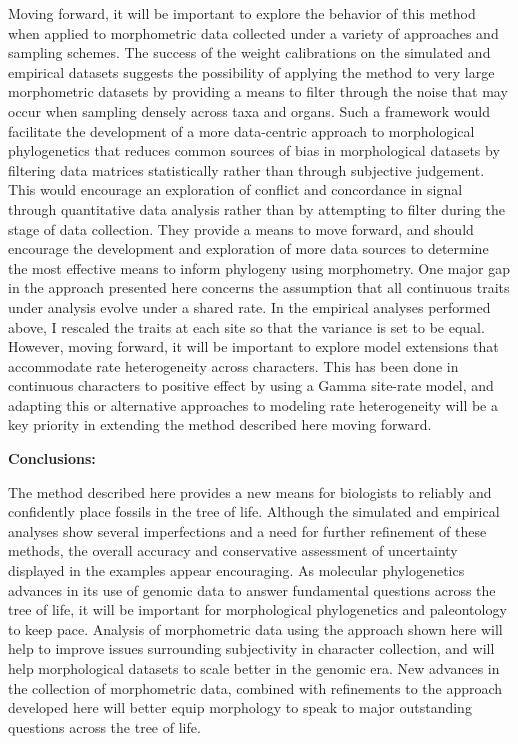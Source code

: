 \documentclass[12pt]{article}
\begin{document}
Moving forward, it will be important to explore the behavior of this
method when applied to morphometric data collected under a variety of
approaches and sampling schemes. The success of the weight calibrations
on the simulated and empirical datasets suggests the possibility of
applying the method to very large morphometric datasets by providing a
means to filter through the noise that may occur when  sampling
densely across taxa and organs. Such a framework would facilitate the
development of a more data-centric approach to morphological
phylogenetics that reduces common sources of bias in morphological 
datasets by filtering data matrices statistically rather than through subjective judgement.
 This would encourage an exploration of conflict and
concordance in signal through quantitative data analysis rather than by
attempting to filter during the stage of data collection. They provide
a means to move forward, and should encourage the development and
exploration of more data sources to determine the most effective means
to inform phylogeny using morphometry. One major gap in the approach 
presented here concerns the assumption that all continuous traits under
analysis evolve under a shared rate. In the empirical analyses performed 
above, I rescaled the traits at each 
site so that the variance is set to be equal. However, moving forward, it 
will be important to explore model extensions that accommodate rate
heterogeneity across characters. This has been done in continuous characters
to positive effect by \cite{schraiber2013inferring} using a Gamma site-rate
model, and adapting this or alternative approaches to modeling rate 
heterogeneity \citep{huelsenbeck2007nonparametric} will be a key 
priority in extending the method described here moving forward.


\noindent\textbf{Conclusions:}

The method described here provides a new means for biologists to
reliably and confidently place fossils in the tree of life. Although the
simulated and empirical analyses show several imperfections and a need
for further refinement of these methods, the overall accuracy and
conservative assessment of uncertainty displayed in the examples appear
encouraging. As molecular phylogenetics advances in its use of genomic
data to answer fundamental questions across the tree of life, it will be
important for morphological phylogenetics and paleontology to keep pace.
Analysis of morphometric data using the approach shown here will help to
improve issues surrounding subjectivity in character collection, and
will help morphological datasets to scale better in the genomic era. New
advances in the collection of morphometric data, combined with
refinements to the approach developed here will better equip morphology
to speak to major outstanding questions across the tree of life.
\end{document}
